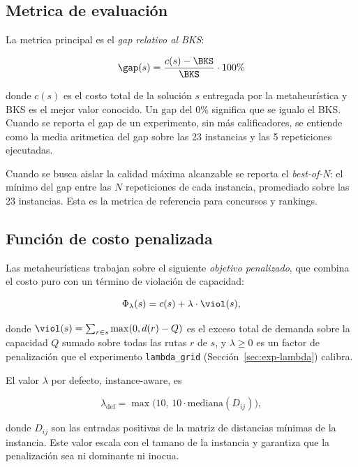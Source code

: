 \subsection{Metrica de evaluación}
\label{sec:metrica}

La metrica principal es el \emph{gap relativo al BKS}:

\begin{equation}
\gap(s) = \frac{c(s) - \BKS}{\BKS} \cdot 100\%
\label{eq:gap}
\end{equation}

donde $c(s)$ es el costo total de la solución $s$ entregada por la
metaheurística y BKS es el mejor valor conocido. Un gap del 0\%
significa que se igualo el BKS. Cuando se reporta el gap de un
experimento, sin más calificadores, se entiende como la media
aritmetica del gap sobre las 23 instancias y las 5 repeticiones
ejecutadas.

Cuando se busca aislar la calidad máxima alcanzable se reporta el
\emph{best-of-N}: el mínimo del gap entre las $N$ repeticiones de cada
instancia, promediado sobre las 23 instancias. Esta es la metrica de
referencia para concursos y rankings.

\subsection{Función de costo penalizada}
\label{sec:costo-penalizado}

Las metaheurísticas trabajan sobre el siguiente \emph{objetivo
penalizado}, que combina el costo puro con un término de violación de
capacidad:

\begin{equation}
\Phi_\lambda(s) = c(s) + \lambda \cdot \viol(s),
\label{eq:objetivo}
\end{equation}

donde $\viol(s) = \sum_{r \in s} \max(0, d(r) - Q)$ es el exceso total
de demanda sobre la capacidad $Q$ sumado sobre todas las rutas $r$ de
$s$, y $\lambda \ge 0$ es un factor de penalización que el experimento
\texttt{lambda\_grid} (Sección~\ref{sec:exp-lambda}) calibra.

El valor $\lambda$ por defecto, instance-aware, es

\begin{equation}
\lambda_{\text{def}} = \max\bigl(10, \, 10 \cdot \mathrm{mediana}(D_{ij})\bigr),
\label{eq:lambda-def}
\end{equation}

donde $D_{ij}$ son las entradas positivas de la matriz de distancias
mínimas de la instancia. Este valor escala con el tamano de la
instancia y garantiza que la penalización sea ni dominante ni
inocua.

